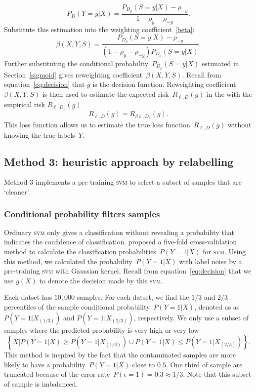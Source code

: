 \documentclass[12pt]{article} %
\newcommand{\svm}{\textsc{svm}}
\newcommand{\loss}{\ell}
\begin{document}
\begin{equation}
    P_D(Y=y|X)=\frac{P_{D_\rho}(S=y|X)-\rho_{-y}}{1-\rho_{y}-\rho_{-y}}.
\end{equation}
Substitute this estimation into the weighting coefficient~\eqref{beta}:
\begin{equation} \label{eq:weighting}
    \beta(X,Y,S)=\frac{P_{D_\rho}(S=y|X)-\rho_{-y}}{(1-\rho_{y}-\rho_{-y})P_{D_\rho}(S=y|X)}.
\end{equation}
Further substituting the conditional probability~$P_{D_\rho}(S=y|X)$ estimated in Section~\ref{sigmoid} gives reweighting coefficient~$\beta(X,Y,S)$.
Recall from equation~\eqref{eq:decision} that  $g$ is the decision function.
Reweighting coefficient~$\beta(X,Y,S)$ is then used to estimate the expected risk~$R_{\loss,D}(g)$ in the with the empirical risk $R_{\loss,D_\rho}(g)$
\begin{equation}
R_{\loss,D}(g) = R_{\beta \loss,D_\rho}(g). \label{eq:loss}
\end{equation}
This loss function allows us to estimate the true loss function~$R_{\loss,D}(g)$ without knowing the true labels~$Y$.

\subsection{Method 3: heuristic approach by relabelling}\label{2nd}
Method 3 implements a pre-training \textsc{svm} to select a subset of samples that are `cleaner'.

\subsubsection{Conditional probability filters samples}\label{2nd2}
Ordinary \textsc{svm} only gives a classification without revealing a probability that indicates the confidence of classification.
\citet{Wu03probabilityestimates} proposed a five-fold cross-validation method to calculate the classification probabilities~$P(Y=1|X)$ for \textsc{svm}.
Using this method, we calculated the probability~$P(Y=1|X)$ with label noise by a pre-training \textsc{svm} with Gaussian kernel. Recall from equation~\eqref{eq:decision} that we use $g(X)$ to denote the decision made by this \svm .

Each datset has $10,000$ samples.
For each datset, we find the $1/3$ and $2/3$ percentiles of the sample conditional probability~$P(Y=1|X)$, denoted as as $P(Y=1|X_{(1/3)})$ and $P(Y=1|X_{(2/3)})$, respectively.
We only use a subset of samples where the predicted probability is very high or very low
\begin{equation}\label{eq:filter}
\left\{X|P(Y=1|X)\geq P(Y=1|X_{(1/3)}) \cup P(Y=1|X)\leq P(Y=1|X_{(2/3)}) \right\}.
\end{equation}
This method is inspired by the fact that the contaminated samples are more likely to have a probability~$P(Y=1|X)$ close to $0.5$. One third of sample are truncated because of the error rate~$P(\epsilon=1)=0.3\approx 1/3$. Note that this subset of sample is imbalanced.
\end{document}
